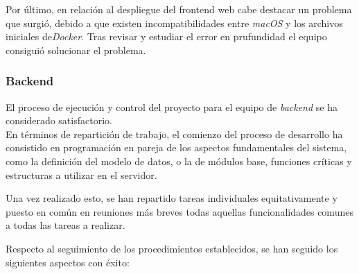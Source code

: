 \documentclass[11pt, a4paper, titlepage]{article}
\begin{document}
Por último, en relación al despliegue del frontend web cabe destacar un problema que surgió, debido a que existen incompatibilidades entre \textit{macOS} y los archivos iniciales de\textit{Docker}. Tras revisar y estudiar el error en prufundidad el equipo consiguió solucionar el problema. 
\subsubsection{Backend}

El proceso de ejecución y control del proyecto para el equipo de \textit{backend} se ha considerado satisfactorio.\\


En términos de repartición de trabajo, el comienzo del proceso de desarrollo ha consistido en programación en pareja de los aspectos fundamentales del sistema, como la definición del modelo de datos, o la de módulos base, funciones críticas y estructuras a utilizar en el servidor.

Una vez realizado esto, se han repartido tareas individuales equitativamente y puesto en común en reuniones más breves todas aquellas funcionalidades comunes a todas las tareas a realizar.


Respecto al seguimiento de los procedimientos establecidos, se han seguido los siguientes aspectos con éxito:
\end{document}
